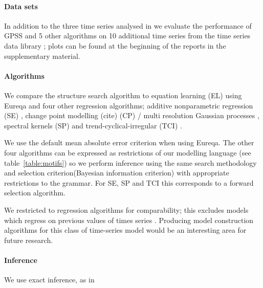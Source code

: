 \documentclass{article}
\begin{document}
\paragraph{Data sets}

In addition to the three time series analysed in \cite{DuvLloGroetal13} we evaluate the performance of GPSS and 5 other algorithms on 10 additional time series from the time series data library \citep{TSDL}; plots can be found at the beginning of the reports in the supplementary material.

\paragraph{Algorithms}

We compare the structure search algorithm to equation learning (EL) using Eureqa \citep{Eureqa} and four other regression algorithms; additive nonparametric regression (SE) \citep[e.g.][]{buja1989linear}, change point modelling (cite) (CP) / multi resolution Gaussian processes \citep[e.g.][]{garnett2010sequential, FoxDunson:NIPS2012}, spectral kernels (SP) \citep{WilAda13} and trend-cyclical-irregular (TCI) \citep[e.g.][]{lind2006basic}.

We use the default mean absolute error criterion when using Eureqa.
The other four algorithms can be expressed as restrictions of our modelling language (see table~\ref{table:motifs}) so we perform inference using the same search methodology and selection criterion\footnotemark (Bayesian information criterion) with appropriate restrictions to the grammar.
For SE, SP and TCI this corresponds to a forward selection algorithm.

We restricted to regression algorithms for comparability; this excludes models which regress on previous values of times series \citep[e.g.][]{box2013time}.
Producing model construction algorithms for this class of time-series model would be an interesting area for future research.

\paragraph{Inference}

We use exact inference, as in \cite{DuvLloGroetal13}
\end{document}
